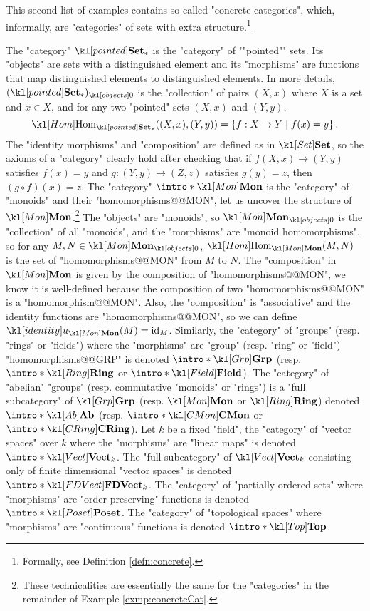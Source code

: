 \documentclass[main.tex]{subfiles}
\begin{document}
\begin{exmps}\label{exmp:concreteCat}
	This second list of examples contains so-called "concrete categories", which, informally, are "categories" of sets with extra structure.\footnote{Formally, see Definition \ref{defn:concrete}.}
	\begin{enumerate}
		\itemAP The "category" $\catPtd$ is the "category" of ""pointed"" sets. Its "objects" are sets with a distinguished element and its "morphisms" are functions that map distinguished elements to distinguished elements. In more details, $\obj{(\catPtd)}$ is the "collection" of pairs $(X,x)$ where $X$ is a set and $x \in X$, and for any two "pointed" sets $(X,x)$ and $(Y,y)$, 
		\[\Hom_{\catPtd}((X,x), (Y,y)) = \left\{ f: X \rightarrow Y \mid f(x) = y \right\}.\]
		The "identity morphisms" and "composition" are defined as in $\catSet$, so the axioms of a "category" clearly hold after checking that if $f(X,x) \rightarrow (Y,y)$ satisfies $f(x) =y$ and $g: (Y,y) \rightarrow (Z,z)$ satisfies $g(y) = z$, then $(g\circ f)(x) = z$.
		\itemAP The "category" $\intro*\catMon$ is the "category" of "monoids" and their "homomorphisms@@MON", let us uncover the structure of $\catMon$.\footnote{These technicalities are essentially the same for the "categories" in the remainder of Example \ref{exmp:concreteCat}.} The "objects" are "monoids", so $\obj{\catMon}$ is the "collection" of all "monoids", and the "morphisms" are "monoid homomorphisms", so for any $M, N \in \obj{\catMon}$, $\Hom_{\catMon}(M,N)$ is the set of "homomorphisms@@MON" from $M$ to $N$. The "composition" in $\catMon$ is given by the composition of "homomorphisms@@MON", we know it is well-defined because the composition of two "homomorphisms@@MON" is a "homomorphism@@MON". Also, the "composition" is "associative" and the identity functions are "homomorphisms@@MON", so we can define $\idu_{\catMon}(M) = \mathrm{id}_M$.
		\itemAP Similarly, the "category" of "groups" (resp. "rings" or "fields") where the "morphisms" are "group" (resp. "ring" or "field") "homomorphisms@@GRP" is denoted $\intro*\catGrp$ (resp. $\intro*\catRing$ or $\intro*\catField$). \AP The "category" of "abelian" "groups" (resp. commutative "monoids" or "rings") is a "full subcategory" of $\catGrp$ (resp. $\catMon$ or $\catRing$) denoted $\intro*\catAb$ (resp. $\intro*\catCMon$ or $\intro*\catCRing$).
		\itemAP Let $k$ be a fixed "field", the "category" of "vector spaces" over $k$ where the "morphisms" are "linear maps" is denoted $\intro*\catVect{k}$. \AP The "full subcategory" of $\catVect{k}$ consisting only of finite dimensional "vector spaces" is denoted $\intro*\catFDVect{k}$.
		\itemAP The "category" of "partially ordered sets" where "morphisms" are "order-preserving" functions is denoted $\intro*\catPoset$.
		\itemAP The "category" of "topological spaces" where "morphisms" are "continuous" functions is denoted $\intro*\catTop$.
	\end{enumerate}
\end{exmps}
\end{document}
